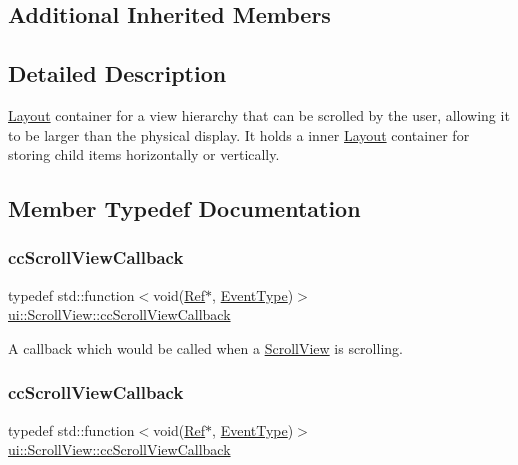 \subsection*{Additional Inherited Members}


\subsection{Detailed Description}
\hyperlink{classui_1_1Layout}{Layout} container for a view hierarchy that can be scrolled by the user, allowing it to be larger than the physical display. It holds a inner {\ttfamily \hyperlink{classui_1_1Layout}{Layout}} container for storing child items horizontally or vertically. 

\subsection{Member Typedef Documentation}
\mbox{\label{classui_1_1ScrollView_ae836cc55536c3cc4f4db5cb99c3c88d5}} 
\subsubsection{\texorpdfstring{cc\+Scroll\+View\+Callback}{ccScrollViewCallback}\hspace{0.1cm}{\footnotesize\ttfamily [1/2]}}
{\footnotesize\ttfamily typedef std\+::function$<$void(\hyperlink{classRef}{Ref}$\ast$, \hyperlink{classui_1_1ScrollView_ac2a08f5665cbbfbff86fe7abdb6fbb02}{Event\+Type})$>$ \hyperlink{classui_1_1ScrollView_ae836cc55536c3cc4f4db5cb99c3c88d5}{ui\+::\+Scroll\+View\+::cc\+Scroll\+View\+Callback}}

A callback which would be called when a \hyperlink{classui_1_1ScrollView}{Scroll\+View} is scrolling. \mbox{\label{classui_1_1ScrollView_ae836cc55536c3cc4f4db5cb99c3c88d5}} 
\subsubsection{\texorpdfstring{cc\+Scroll\+View\+Callback}{ccScrollViewCallback}\hspace{0.1cm}{\footnotesize\ttfamily [2/2]}}
{\footnotesize\ttfamily typedef std\+::function$<$void(\hyperlink{classRef}{Ref}$\ast$, \hyperlink{classui_1_1ScrollView_ac2a08f5665cbbfbff86fe7abdb6fbb02}{Event\+Type})$>$ \hyperlink{classui_1_1ScrollView_ae836cc55536c3cc4f4db5cb99c3c88d5}{ui\+::\+Scroll\+View\+::cc\+Scroll\+View\+Callback}}

